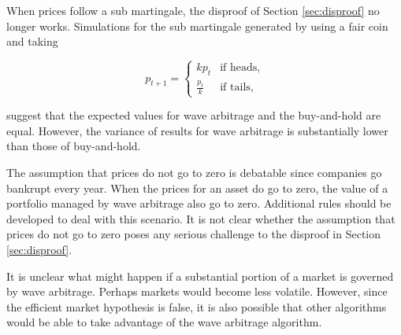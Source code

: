 \documentclass{article}
\begin{document}
When prices follow a sub martingale, the disproof of Section \ref{sec:disproof}
no longer works. Simulations for the sub martingale generated by using a fair
coin and taking

\begin{equation}
  p_{t+1} =
    \begin{cases}
      k p_t         & \mbox{if heads,} \\
      \frac{p_t}{k} & \mbox{if tails,}
    \end{cases}
\end{equation}

suggest that the expected values for wave arbitrage and the buy-and-hold are
equal. However, the variance of results for wave arbitrage is substantially
lower than those of buy-and-hold.

The assumption that prices do not go to zero is debatable since companies go
bankrupt every year. When the prices for an asset do go to zero, the value of a
portfolio managed by wave arbitrage also go to zero. Additional rules should be
developed to deal with this scenario. It is not clear whether the assumption
that prices do not go to zero poses any serious challenge to the disproof in
Section \ref{sec:disproof}.

It is unclear what might happen if a substantial portion of a market is
governed by wave arbitrage. Perhaps markets would become less volatile.
However, since the efficient market hypothesis is false, it is also possible
that other algorithms would be able to take advantage of the wave arbitrage
algorithm.



\end{document}
